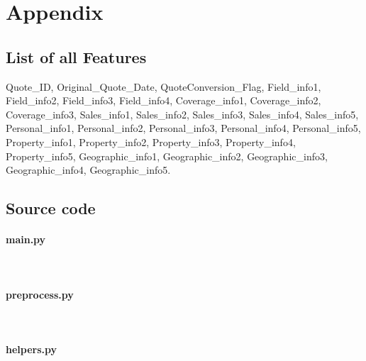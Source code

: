 \section{Appendix}
\label{sec:anhang}


\subsection{List of all Features}
 Quote\_ID, Original\_Quote\_Date, QuoteConversion\_Flag, Field\_info1, Field\_info2, Field\_info3, Field\_info4, Coverage\_info1, Coverage\_info2, Coverage\_info3, Sales\_info1, Sales\_info2, Sales\_info3, Sales\_info4, Sales\_info5, Personal\_info1, Personal\_info2, Personal\_info3, Personal\_info4, Personal\_info5, Property\_info1, Property\_info2, Property\_info3, Property\_info4, Property\_info5, Geographic\_info1, Geographic\_info2, Geographic\_info3, Geographic\_info4, Geographic\_info5.
 
\subsection{Source code}
 
\paragraph{main.py} \,

\paragraph{preprocess.py} \,

\paragraph{helpers.py} \,
